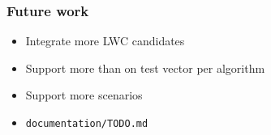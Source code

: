 \documentclass[english]{beamer}
\begin{document}
\begin{frame}
  \frametitle{Future work}

  \begin{itemize}
  \item Integrate more LWC candidates
  \item Support more than on test vector per algorithm
  \item Support more scenarios
  \item \texttt{documentation/TODO.md}
  \end{itemize}

\end{frame}
\end{document}
